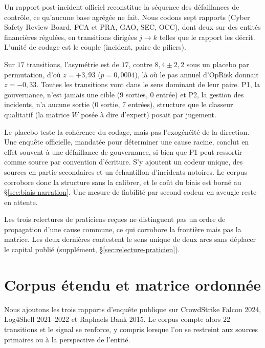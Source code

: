 Un rapport post-incident officiel reconstitue la séquence des défaillances de contrôle, ce
qu'aucune base agrégée ne fait. Nous codons sept rapports (Cyber Safety Review Board, FCA et PRA,
GAO, SEC, OCC), dont deux sur des entités financières régulées, en transitions dirigées $j \to k$
telles que le rapport les décrit. L'unité de codage est le couple (incident, paire de piliers).

Sur $17$ transitions, l'asymétrie est de $17$, contre $8{,}4 \pm 2{,}2$ sous un placebo par
permutation, d'où $z=+3{,}93$ ($p=0{,}0004$), là où le pas annuel d'OpRisk donnait $z=-0{,}33$.
Toutes les transitions vont dans le sens dominant de leur paire. P1, la gouvernance, n'est jamais une
cible ($9$ sorties, $0$ entrée) et P2, la gestion des incidents, n'a aucune sortie ($0$ sortie,
$7$ entrées), structure que le classeur qualitatif (la matrice $W$ posée à dire d'expert) posait par jugement.

Le placebo teste la cohérence du codage, mais pas l'exogénéité de la direction. Une enquête
officielle, mandatée pour déterminer une cause racine, conclut en effet souvent à une défaillance de
gouvernance, si bien que P1 peut ressortir comme source par convention d'écriture. S'y ajoutent un
codeur unique, des sources en partie secondaires et un échantillon d'incidents notoires. Le corpus
corrobore donc la structure sans la calibrer, et le coût du biais est borné au
\S\ref{sec:biais-narration}. Une mesure de fiabilité par second codeur en aveugle reste en attente.

Les trois relectures de praticiens reçues ne distinguent pas un ordre de propagation d'une cause
commune, ce qui corrobore la frontière mais pas la matrice. Les deux dernières contestent le sens
unique de deux arcs sans déplacer le capital publié (supplément, \S\ref{sec:relecture-praticien}).

\section{Corpus étendu et matrice ordonnée}
\label{sec:corpus-etendu}

Nous ajoutons les trois rapports d'enquête publique sur CrowdStrike Falcon 2024, Log4Shell
2021--2022 et Raphaels Bank 2015. Le corpus compte alors $22$ transitions et le signal se renforce, y
compris lorsque l'on se restreint aux sources primaires ou à la perspective de l'entité.

